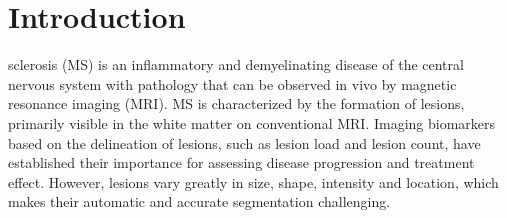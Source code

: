 \section{Introduction}

sclerosis (MS) is an inflammatory and demyelinating disease of the central
nervous system with pathology that can be observed in vivo by magnetic resonance
imaging (MRI). MS is characterized by the formation of lesions, primarily
visible in the white matter on conventional MRI. Imaging biomarkers based on the
delineation of lesions, such as lesion load and lesion count, have established
their importance for assessing disease progression and treatment effect.
However, lesions vary greatly in size, shape, intensity and location, which
makes their automatic and accurate segmentation challenging.



